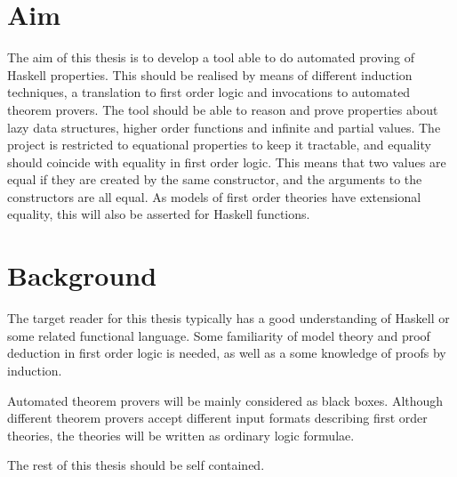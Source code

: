 \section{Aim}

The aim of this thesis is to develop a tool able to do automated
proving of Haskell properties. This should be realised by means of
different induction techniques, a translation to first order logic and
invocations to automated theorem provers. The tool should be able to
reason and prove properties about lazy data structures, higher order
functions and infinite and partial values. The project is restricted
to equational properties to keep it tractable, and equality should
coincide with equality in first order logic. This means that two
values are equal if they are created by the same constructor, and the
arguments to the constructors are all equal. As models of first order
theories have extensional equality, this will also be asserted for
Haskell functions.

\section{Background}

The target reader for this thesis typically has a good understanding
of Haskell or some related functional language. Some familiarity
of model theory and proof deduction in first order logic is
needed, as well as a some knowledge of proofs by induction.

Automated theorem provers will be mainly considered as black
boxes. Although different theorem provers accept different input
formats describing first order theories, the theories will be written
as ordinary logic formulae.

The rest of this thesis should be self contained.












































